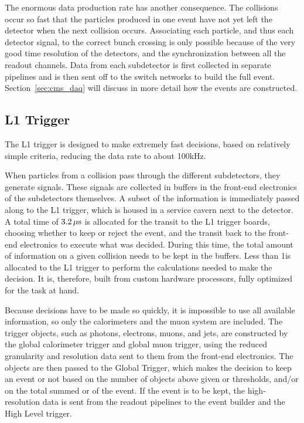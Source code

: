 The enormous data production rate has another consequence. The collisions occur so fast that the
particles produced in one event have not yet left the detector when the next collision occurs. 
Associating each particle, and thus each detector signal, to the correct bunch crossing is only
possible because of the very good time resolution of the detectors, and the synchronization between
all the readout channels. 
Data from each subdetector is first collected in separate pipelines and is then sent off to the
switch networks to build the full event. Section~\ref{sec:cms_daq} will discuss in more detail how
the events are constructed.

\subsection{L1 Trigger \label{sec:cms_level_one}}

The L1 trigger is designed to make extremely fast decisions, based on relatively simple criteria,
reducing the data rate to about 100\unit{kHz}. 

When particles from a collision pass through the different subdetectors, they generate signals.
These signals are collected in buffers in the front-end electronics of the subdetectors themselves. 
A subset of the information is immediately passed along to the L1 trigger, which is housed
in a service cavern next to the detector. A total time of $3.2\,\mu\text{s}$ is allocated for the transit to
the L1 trigger boards, choosing whether to keep or reject the event, and the transit back to the
front-end electronics to execute what was decided. During this time, the total amount of information
on a given collision needs to be kept in the buffers.
Less than 1\mus is allocated to the L1 trigger to perform the calculations needed to make the
decision. It is, therefore, built from custom hardware processors, fully optimized for the task at
hand. 

Because decisions have to be made so quickly, it is impossible to use all available information, so
 only the calorimeters and the muon system are included. 
The trigger objects, such as photons, electrons, muons, and jets, are constructed by the global
calorimeter trigger and global muon trigger, using the reduced granularity and resolution data
sent to them from the front-end electronics. The objects are then passed to the Global Trigger,
which makes the decision to keep an event or not based on the number of objects above given \ET
or \pt thresholds, and/or on the total summed \ET or \ETm of the event. If the event is to be kept,
the high-resolution data is sent from the readout pipelines to the event builder and the High
Level trigger. 

